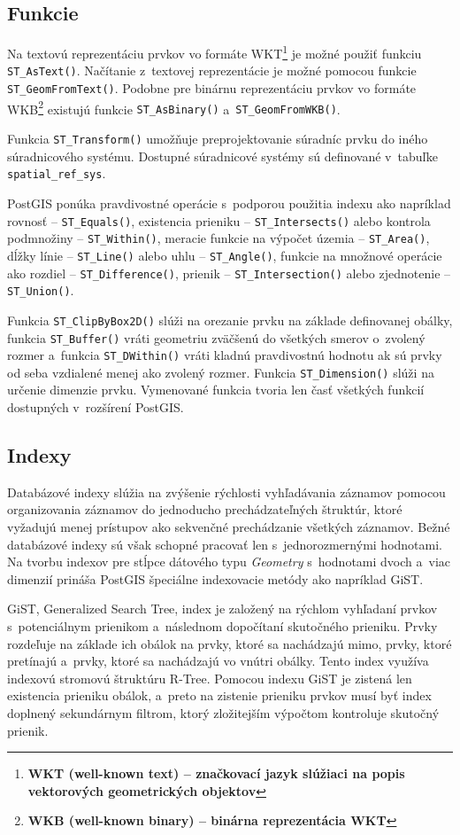 \subsection*{Funkcie}
Na textovú reprezentáciu prvkov vo formáte WKT\footnote{\bf WKT \rm (well-known text) -- značkovací jazyk slúžiaci na popis vektorových geometrických objektov} je možné použiť funkciu {\tt ST\_AsText()}. Načítanie z~textovej reprezentácie je možné pomocou funkcie {\tt ST\_GeomFromText()}. Podobne pre binárnu reprezentáciu prvkov vo formáte WKB\footnote{\bf WKB \rm (well-known binary) -- binárna reprezentácia WKT} existujú funkcie {\tt ST\_AsBinary()} a~{\tt ST\_GeomFromWKB()}.

Funkcia {\tt ST\_Transform()} umožňuje preprojektovanie súradníc prvku do iného súradnicového systému. Dostupné súradnicové systémy sú definované v~tabuľke {\tt spatial\_ref\_sys}.

PostGIS ponúka pravdivostné operácie s~podporou použitia indexu ako napríklad rovnosť -- {\tt ST\_Equals()}, existencia prieniku -- {\tt ST\_Intersects()} alebo kontrola podmnožiny -- {\tt ST\_Within()}, meracie funkcie na výpočet územia -- {\tt ST\_Area()}, dĺžky línie -- {\tt ST\_Line()} alebo uhlu -- {\tt ST\_Angle()}, funkcie na množnové operácie ako rozdiel -- {\tt ST\_Difference()}, prienik -- {\tt ST\_Intersection()} alebo zjednotenie -- {\tt ST\_Union()}. 

Funkcia {\tt ST\_ClipByBox2D()} slúži na orezanie prvku na základe definovanej obálky, funkcia {\tt ST\_Buffer()} vráti geometriu zväčšenú do všetkých smerov o~zvolený rozmer a~funkcia {\tt ST\_DWithin()} vráti kladnú pravdivostnú hodnotu ak sú prvky od seba vzdialené menej ako zvolený rozmer. Funkcia {\tt ST\_Dimension()} slúži na určenie dimenzie prvku. Vymenované funkcia tvoria len časť všetkých funkcií dostupných v~rozšírení PostGIS.

\subsection*{Indexy}
Databázové indexy slúžia na zvýšenie rýchlosti vyhľadávania záznamov pomocou organizovania záznamov do jednoducho prechádzateľných štruktúr, ktoré vyžadujú menej prístupov ako sekvenčné prechádzanie všetkých záznamov. Bežné databázové indexy sú však schopné pracovať len s~jednorozmernými hodnotami. Na tvorbu indexov pre stĺpce dátového typu {\it Geometry} s~hodnotami dvoch a~viac dimenzií prináša PostGIS špeciálne indexovacie metódy ako napríklad GiST.

GiST, Generalized Search Tree, index je založený na rýchlom vyhľadaní prvkov s~potenciálnym prienikom a~následnom dopočítaní skutočného prieniku. Prvky rozdeľuje na základe ich obálok na prvky, ktoré sa nachádzajú mimo, prvky, ktoré pretínajú a~prvky, ktoré sa nachádzajú vo vnútri obálky. Tento index využíva indexovú stromovú štruktúru R-Tree. Pomocou indexu GiST je zistená len existencia prieniku obálok, a~preto na zistenie prieniku prvkov musí byť index doplnený sekundárnym filtrom, ktorý zložitejším výpočtom kontroluje skutočný prienik.



